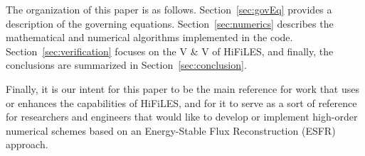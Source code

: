 The organization of this paper is as follows. Section~\ref{sec:govEq} provides a description of the governing equations. Section~\ref{sec:numerics} describes the mathematical and numerical algorithms implemented in the code. Section~\ref{sec:verification} focuses on the V \& V of HiFiLES, and finally, the conclusions are summarized in Section~\ref{sec:conclusion}.

Finally, it is our intent for this paper to be the main reference for work that uses or enhances the capabilities of HiFiLES, and for it to serve as a sort of reference for researchers and engineers that would like to develop or implement high-order numerical schemes based on an Energy-Stable Flux Reconstruction (ESFR) approach.
